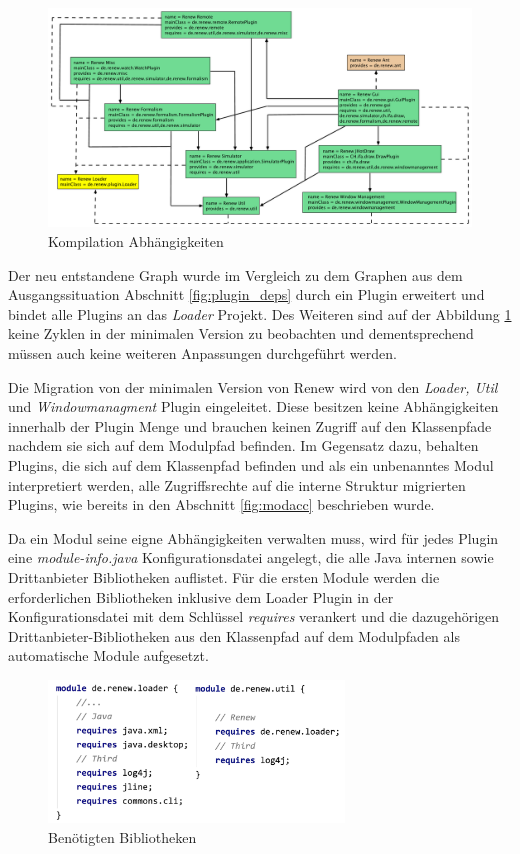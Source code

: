 	\begin{figure}[h!]
	  \centering
	  \includegraphics[width=\textwidth]{material/images/renew_plugin_dependencies-module-info.pdf}
	  \caption{Kompilation Abhängigkeiten}
	  \label{fig:deps}
	\end{figure}

	Der neu entstandene Graph wurde im Vergleich zu dem Graphen aus dem Ausgangssituation Abschnitt \ref{fig:plugin_deps} durch ein Plugin erweitert und bindet alle Plugins an das \textit{Loader} Projekt. Des Weiteren sind auf der Abbildung \ref{fig:deps} keine Zyklen in der minimalen Version zu beobachten und dementsprechend müssen auch keine weiteren Anpassungen durchgeführt werden. \bigbreak

	Die Migration von der minimalen Version von Renew wird von den \textit{Loader, Util} und \textit{Windowmanagment} Plugin eingeleitet. Diese besitzen keine Abhängigkeiten innerhalb der Plugin Menge und brauchen keinen Zugriff auf den Klassenpfade nachdem sie sich auf dem Modulpfad befinden. Im Gegensatz dazu, behalten Plugins, die sich auf dem Klassenpfad befinden und als ein unbenanntes Modul interpretiert werden, alle Zugriffsrechte auf die interne Struktur migrierten Plugins, wie bereits in den Abschnitt \ref{fig:modacc} beschrieben wurde.\bigbreak

	Da ein Modul seine eigne Abhängigkeiten verwalten muss, wird für jedes Plugin eine \textit{module-info.java} Konfigurationsdatei angelegt, die alle Java internen sowie Drittanbieter Bibliotheken auflistet. Für die ersten Module werden die erforderlichen Bibliotheken inklusive dem Loader Plugin in der Konfigurationsdatei mit dem Schlüssel \textit{requires} verankert und die dazugehörigen Drittanbieter-Bibliotheken aus den Klassenpfad auf dem Modulpfaden als automatische Module aufgesetzt.

	\begin{figure}[h!]
	  \centering
	  \includegraphics[width=0.7\textwidth]{material/images/loaderUtil-info.png}
	  \caption{Benötigten Bibliotheken}
	  \label{fig:loaderUtil}
	\end{figure}

